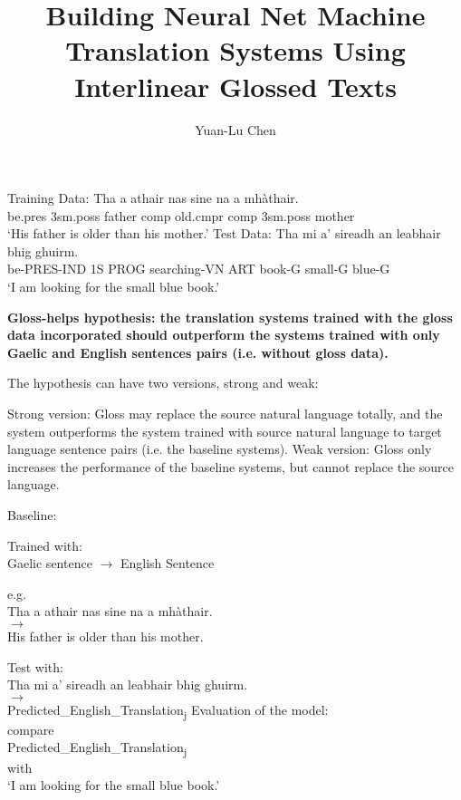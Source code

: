 \documentclass[a4paper]{article}
\title{Building Neural Net Machine Translation Systems Using Interlinear Glossed Texts}
\author{Yuan-Lu Chen}
\begin{document}
\maketitle


\begin{exe}
\ex 
\begin{xlist}  
\ex Training Data:
	\gll    Tha a athair nas sine na a mh\`athair.\\  
            be.pres 3sm.poss father comp old.cmpr comp 3sm.poss mother
\\  
    \glt    `His father is older than his mother.' 
\ex Test Data:
\gll Tha mi a' sireadh an leabhair bhig ghuirm.\\
be-PRES-IND 1S PROG searching-VN ART book-G small-G blue-G\\
\glt `I am looking for the small blue book.' 
\end{xlist}
\end{exe}

\begin{exe} 
\ex \textbf{Gloss-helps hypothesis: the translation systems trained with the gloss data incorporated should outperform the systems trained with only Gaelic and English sentences pairs (i.e. without gloss data).}

The hypothesis can have two versions, strong and weak:
	\begin{xlist}
	\ex \label{strong_hy} Strong version: Gloss may replace the source natural language totally, and the system outperforms the system trained with source natural language to target language sentence pairs (i.e. the baseline systems).  
	\ex \label{weak_hy} Weak version: Gloss only increases the performance of the baseline systems, but cannot replace the source language.
	\end{xlist}
\end{exe}


\begin{exe}  
\ex Baseline: 
\begin{xlist}
	\ex Trained with:\\
	 Gaelic sentence $\rightarrow$ English Sentence 
	\begin{xlist}
		\ex e.g. \\
			Tha a athair nas sine na a mh\`athair. \\
			$\rightarrow$ \\
			His father is older than his mother.
	\end{xlist}
	\ex Test with:\\
		Tha mi a' sireadh an leabhair bhig ghuirm.\\
		$\rightarrow$ \\
		Predicted\_English\_Translation\textsubscript{j}
	\ex Evaluation of the model:\\
		compare\\ Predicted\_English\_Translation\textsubscript{j}\\ with\\
		`I am looking for the small blue book.'  
\end{xlist}
\end{exe}
\end{document}
